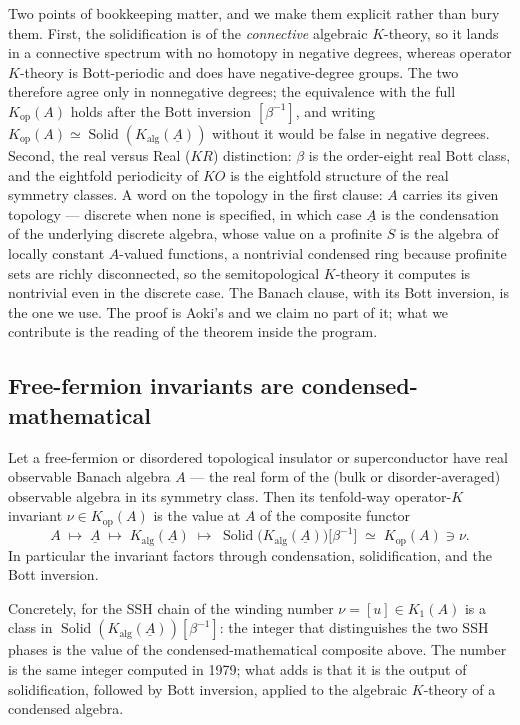 \documentclass[12pt]{article}
\newcommand{\cond}[1]{\underline{#1}}          %
\newcommand{\Kop}{K_{\mathrm{op}}}             %
\newcommand{\Kalg}{K_{\mathrm{alg}}}           %
\newcommand{\Solid}{\operatorname{Solid}}      %
\theoremstyle{plain}
\begin{document}
Two points of bookkeeping matter, and we make them explicit rather than bury them.
First, the solidification is of the \emph{connective} algebraic $K$-theory, so it
lands in a connective spectrum with no homotopy in negative degrees, whereas operator
$K$-theory is Bott-periodic and does have negative-degree groups. The two therefore
agree only in nonnegative degrees; the equivalence with the full $\Kop(A)$ holds after
the Bott inversion $[\beta^{-1}]$, and writing
$\Kop(A)\simeq\Solid(\Kalg(\cond{A}))$ without it would be false in negative degrees.
Second, the real versus Real ($KR$) distinction: $\beta$ is the order-eight real Bott
class, and the eightfold periodicity of $KO$ is the eightfold structure of the real
symmetry classes. A word on the topology in the first clause: $A$ carries its given
topology --- discrete when none is specified, in which case $\cond{A}$ is the
condensation of the underlying discrete algebra, whose value on a profinite $S$ is the
algebra of locally constant $A$-valued functions, a nontrivial condensed ring because
profinite sets are richly disconnected, so the semitopological $K$-theory it computes
is nontrivial even in the discrete case. The Banach clause, with its Bott inversion,
is the one we use. The proof is Aoki's and we claim no part of it; what we contribute
is the reading of the theorem inside the program.

\subsection{Free-fermion invariants are condensed-mathematical}

\begin{corollary}
\label{cor:condinvariant}
Let a free-fermion or disordered topological insulator or superconductor have real
observable Banach algebra $A$ --- the real form of the (bulk or disorder-averaged)
observable algebra in its symmetry class. Then its tenfold-way operator-$K$
invariant $\nu\in\Kop(A)$ is the value at $A$ of the composite functor
\[
  A \;\longmapsto\; \cond{A} \;\longmapsto\; \Kalg(\cond{A})
    \;\longmapsto\; \Solid\bigl(\Kalg(\cond{A})\bigr)\bigl[\beta^{-1}\bigr]
    \;\simeq\; \Kop(A) \ni \nu.
\]
In particular the invariant factors through condensation, solidification, and the
Bott inversion.
\end{corollary}

\noindent Concretely, for the SSH chain of  the winding number
$\nu=[u]\in K_{1}(A)$ is a class in $\Solid(\Kalg(\cond{A}))[\beta^{-1}]$: the integer
that distinguishes the two SSH phases is the value of the condensed-mathematical
composite above. The number is the same integer computed in 1979; what
 adds is that it is the output of solidification, followed by Bott
inversion, applied to the algebraic $K$-theory of a condensed algebra.
\end{document}
